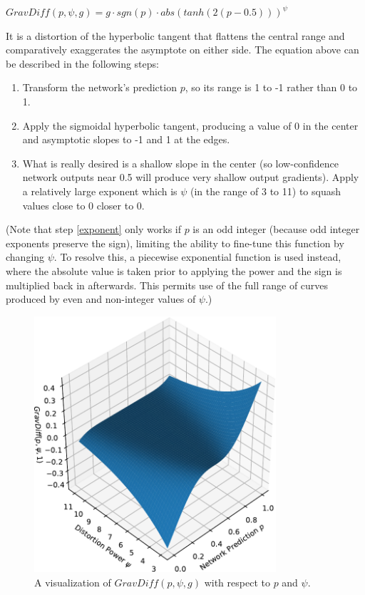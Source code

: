 \documentclass[10pt]{article}
\begin{document}
$GravDiff(p, \psi, g) = g \cdot sgn(p) \cdot abs(tanh(2(p - 0.5))) ^ \psi$

It is a distortion of the hyperbolic tangent that flattens the central range and comparatively exaggerates the asymptote on either side. The equation above can be described in the following steps:

\begin{enumerate}
    \item Transform the network's prediction $p$, so its range is 1 to -1 rather than 0 to 1.
    \item Apply the sigmoidal hyperbolic tangent, producing a value of 0 in the center and asymptotic slopes to -1 and 1 at the edges.
    \item \label{exponent} What is really desired is a shallow slope in the center (so low-confidence network outputs near 0.5 will produce very shallow output gradients). Apply a relatively large exponent which is $\psi$ (in the range of 3 to 11) to squash values close to 0 closer to 0.
\end{enumerate}

(Note that step \ref{exponent} only works if $p$ is an odd integer (because odd integer exponents preserve the sign), limiting the ability to fine-tune this function by changing $\psi$. To resolve this, a piecewise exponential function is used instead, where the absolute value is taken prior to applying the power and the sign is multiplied back in afterwards. This permits use of the full range of curves produced by even and non-integer values of $\psi$.)

\begin{figure}[H]
    \centering
    \includegraphics[width=0.8\textwidth]{grav_diff}
    \caption{\label{grav_diff} A visualization of $GravDiff(p, \psi, g)$ with respect to $p$ and $\psi$.}
\end{figure}
\end{document}
